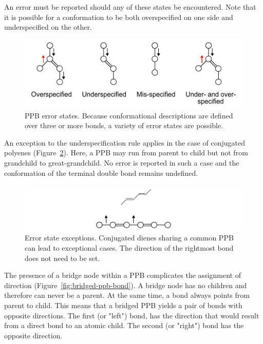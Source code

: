 \documentclass{article}
\begin{document}
An error must be reported should any of these states be encountered. Note that it is possible for a conformation to be both overspecified on one side and underspecified on the other.

\begin{figure}
    \centering
    \includegraphics[width=\columnwidth]{ppb-error-states.pdf}
    \caption{PPB error states. Because conformational descriptions are defined over three or more bonds, a variety of error states are possible.}
    \label{fig:bond-error-states}
\end{figure}

An exception to the underspecification rule applies in the case of conjugated polyenes (Figure~\ref{fig:bond-error-state-exceptions}). Here, a PPB may run from parent to child but not from grandchild to great-grandchild. No error is reported in such a case and the conformation of the terminal double bond remains undefined.

\begin{figure}
    \centering
    \includegraphics[width=\columnwidth]{ppb-error-state-exception.pdf}
    \caption{Error state exceptions. Conjugated dienes sharing a common PPB can lead to exceptional cases. The direction of the rightmost bond does not need to be set.}
    \label{fig:bond-error-state-exceptions}
\end{figure}

The presence of a bridge node within a PPB complicates the assignment of direction (Figure~\ref{fig:bridged-ppb-bond}). A bridge node has no children and therefore can never be a parent. At the same time, a bond always points from parent to child. This means that a bridged PPB yields a pair of bonds with opposite directions. The first (or "left") bond, has the direction that would result from a direct bond to an atomic child. The second (or "right") bond has the opposite direction.
\end{document}
